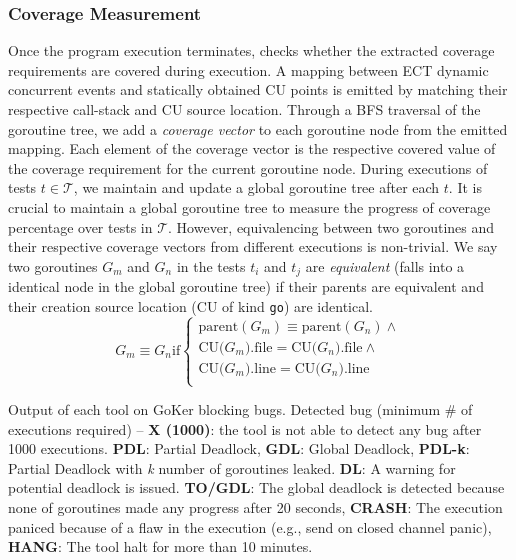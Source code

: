 \subsubsection{Coverage Measurement}
Once the program execution terminates, \goat checks whether the extracted coverage requirements are covered during execution.
%
A mapping between ECT dynamic concurrent events and statically obtained CU points is emitted by matching their respective call-stack and CU source location.
%
Through a BFS traversal of the goroutine tree, we add a \textit{coverage vector} to each goroutine node from the emitted mapping.
%
Each element of the coverage vector is the respective covered value of the coverage requirement for the current goroutine node.
%
During executions of tests $t \in \mathcal{T}$, we maintain and update a global goroutine tree after each $t$.
%
It is crucial to maintain a global goroutine tree to measure the progress of coverage percentage over tests in $\mathcal{T}$.
%
However, equivalencing between two goroutines and their respective coverage vectors from different executions is non-trivial.
%
We say two goroutines $G_m$ and $G_n$ in the tests $t_i$ and $t_j$ are \textit{equivalent} (\ie falls into a identical node in the global goroutine tree) if their parents are equivalent and their creation source location (CU of kind \texttt{go}) are identical.
%
\begin{equation}
  G_m \equiv G_n   \text{if}
  \begin{cases}
    \text{parent}(G_m) \equiv \text{parent}(G_n)  \wedge \\
    \text{CU(}G_m\text{).file} = \text{CU(}G_n\text{).file}  \wedge\\
    \text{CU(}G_m\text{).line} = \text{CU(}G_n\text{).line} \\
  \end{cases}
\end{equation}


\begin{table}[]
\caption{Output of each tool on GoKer \cite{yuan-gobench-cgo21} blocking bugs. Detected bug (minimum \# of executions required) -- \textbf{X (1000)}: the tool is not able to detect any bug after 1000 executions. \textbf{PDL}: Partial Deadlock, \textbf{GDL}: Global Deadlock, \textbf{PDL-k}: Partial Deadlock with \textit{k} number of goroutines leaked. \textbf{DL}: A warning for potential deadlock is issued. \textbf{TO/GDL}: The global deadlock is detected because none of goroutines made any progress after 20 seconds, \textbf{CRASH}: The execution paniced because of a flaw in the execution (e.g., send on closed channel panic), \textbf{HANG}: The tool halt for more than 10 minutes.}
\centering
\scalebox{0.72}{
    
  }
\label{tab:comparison}
\end{table}
